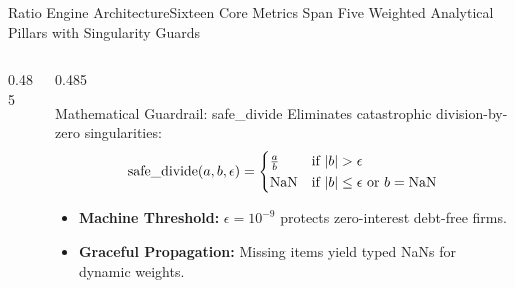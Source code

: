 \begin{frame}{Ratio Engine Architecture}{Sixteen Core Metrics Span Five Weighted Analytical Pillars with Singularity Guards}
\begin{columns}[T,onlytextwidth]
\begin{column}{0.485\textwidth}
\begin{tcolorbox}
                \vfill
            \end{tcolorbox}
        \end{column}

        \begin{column}{0.485\textwidth}
            \begin{mathcard}[height=2.74cm]{Mathematical Guardrail: safe\_divide}
                \fontsize{5.7pt}{6.9pt}\selectfont
                Eliminates catastrophic division-by-zero singularities:
                \begin{equation*}
                    \textstyle \mathrm{safe\_divide}(a, b, \epsilon) = 
                    \begin{cases} 
                        \frac{a}{b} & \text{if } |b| > \epsilon \\[1pt]
                        \text{NaN} & \text{if } |b| \le \epsilon \text{ or } b = \text{NaN}
                    \end{cases}
                \end{equation*}
                \begin{itemize}
                    \setlength{\itemsep}{1.2pt}
                    \item \textbf{Machine Threshold:} $\epsilon = 10^{-9}$ protects zero-interest debt-free firms.
                    \item \textbf{Graceful Propagation:} Missing items yield typed NaNs for dynamic weights.
                \end{itemize}
            \end{mathcard}

            \vspace{0.12cm}


\end{column}
\end{columns}
\end{frame}
